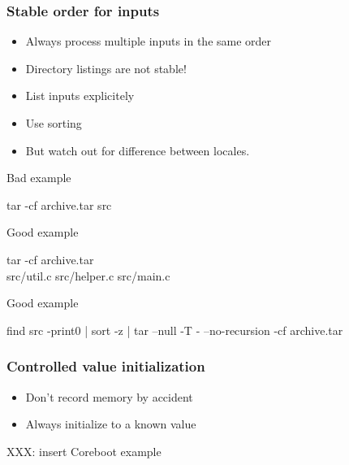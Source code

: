\documentclass[14pt,ignorenonframetext]{beamer}
\begin{document}
\begin{frame}[fragile]
 \frametitle{Stable order for inputs}

 \begin{overprint}
  \begin{itemize}
   \item Always process multiple inputs in the same order
   \item Directory listings are not stable!
  \end{itemize}

  \begin{itemize}
   \item List inputs explicitely
  \end{itemize}

  \begin{itemize}
   \item Use sorting
   \item<4> \alert{But watch out for difference between locales.}
  \end{itemize}
 \end{overprint}

 \begin{overprint}
  \begin{block}{Bad example}
\begin{semiverbatim}
tar -cf archive.tar src
\end{semiverbatim}
  \end{block}

  \begin{block}{Good example}
\begin{semiverbatim}
tar -cf archive.tar \\
  src/util.c src/helper.c src/main.c
\end{semiverbatim}
  \end{block}

  \begin{block}{Good example}
\begin{semiverbatim}
find src -print0 | sort -z  |
    tar --null -T - --no-recursion -cf archive.tar
\end{semiverbatim}
  \end{block}
 \end{overprint}
\end{frame}

\begin{frame}
 \frametitle{Controlled value initialization}

 \begin{itemize}
  \item Don't record memory by accident
  \item<2>Always initialize to a known value
 \end{itemize}

 \begin{example}
\begin{semiverbatim}
    XXX: insert Coreboot example
\end{semiverbatim}
 \end{example}
\end{frame}
\end{document}
